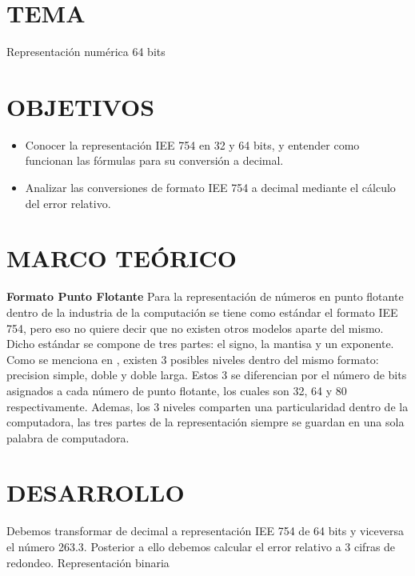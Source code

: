 \documentclass[12pt]{article}
\begin{document}
\section*{TEMA}
Representación numérica 64 bits

\vspace{0.5cm}

\section*{OBJETIVOS}
\begin{itemize}
    \item Conocer la representación IEE 754 en 32 y 64 bits, y entender como funcionan las fórmulas para su conversión a decimal.
    \item Analizar las conversiones de formato IEE 754 a decimal mediante el cálculo del error relativo.
\end{itemize}

\vspace{0.5cm}

\section*{MARCO TEÓRICO}

\large\textbf{Formato Punto Flotante}
\normalsize\newline\newline
Para la representación de números en punto flotante dentro de la industria de la computación se tiene como estándar el formato IEE 754, pero eso no quiere decir que no existen otros modelos aparte del mismo. Dicho estándar se compone de tres partes: el signo, la mantisa y un exponente.
Como se menciona en \cite{sauer2013}, existen 3 posibles niveles dentro del mismo formato: precision simple, doble y doble larga. Estos 3 se diferencian por el número de bits asignados a cada número de punto flotante, los cuales son 32, 64 y 80 respectivamente. Ademas, los 3 niveles comparten una particularidad dentro de la computadora, las tres partes de la representación siempre se guardan en una sola palabra de computadora.

\vspace{0.5cm}

\section*{DESARROLLO}
Debemos transformar de decimal a representación IEE 754 de 64 bits y viceversa el número 263.3. Posterior a ello debemos calcular el error relativo a 3 cifras de redondeo.
Representación binaria
\end{document}
